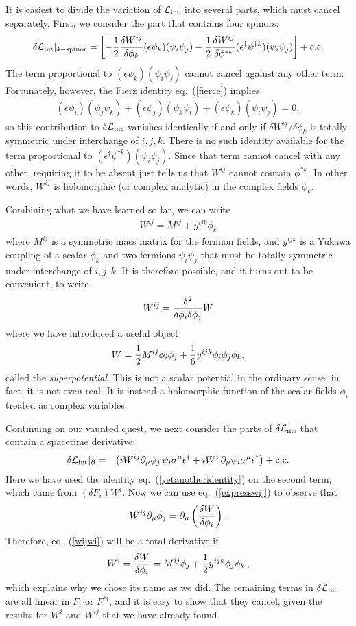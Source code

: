 \documentclass[12pt]{article}
\def\beq{\begin{eqnarray}}
\def\eeq{\end{eqnarray}}
\def\lagr{{\cal L}}
\def\conj{{{\rm c.c.}}}
\begin{document}
It is easiest to divide the variation of $\lagr_{\rm int}$ into several
parts, which must cancel separately. First, we consider the part that
contains four spinors:
\beq
\delta \lagr_{\rm int} |_{\rm 4-spinor} = \left [
-{1\over 2} {\delta W^{ij} \over \delta \phi_k} 
  (\epsilon \psi_k)(\psi_i \psi_j)
-{1\over 2} {\delta W^{ij} \over \delta \phi^{*k}}
  ({\epsilon^\dagger}{\psi}^{\dagger k})(\psi_i \psi_j) \right ]
+ \conj
\label{deltafourferm}
\eeq
The term proportional to $(\epsilon \psi_k)(\psi_i\psi_j)$ cannot cancel
against any other term. Fortunately, however, the Fierz identity
eq.~(\ref{fierce}) implies
\beq
(\epsilon \psi_i) (\psi_j \psi_k) + (\epsilon \psi_j) (\psi_k \psi_i)
+ (\epsilon \psi_k) (\psi_i\psi_j) = 0 ,
\eeq
so this contribution to $\delta\lagr_{\rm int}$ vanishes identically if
and only if $\delta W^{ij}/\delta \phi_k$ is totally symmetric under
interchange of $i,j,k$. There is no such identity available for the term
proportional to $({\epsilon^\dagger } {\psi}^{\dagger k})(\psi_i\psi_j)$.
Since that term cannot cancel with any other, requiring it to be absent
just tells us that $W^{ij}$ cannot contain $\phi^{*k}$. In other words,
$W^{ij}$ is holomorphic (or complex analytic) in the complex fields $\phi_k$.

Combining what we have learned  so far, we can write
\beq
W^{ij} = M^{ij} + y^{ijk} \phi_k
\eeq
where $M^{ij}$ is a symmetric mass matrix for the fermion fields, and
$y^{ijk}$ is a Yukawa coupling of a scalar $\phi_k$ and two fermions
$\psi_i \psi_j$ that must be totally symmetric under interchange of
$i,j,k$. It is therefore possible, and it turns out to be convenient, to
write
\beq
W^{ij} = {\delta^2 \over \delta\phi_i\delta\phi_j} W
\label{expresswij}
\eeq
where we have introduced a useful object
\beq
W =
{1\over 2} M^{ij} \phi_i \phi_j + {1\over 6} y^{ijk} \phi_i \phi_j \phi_k,
\label{superpotential}
\eeq
called the {\it superpotential}. This is not a
scalar potential in the ordinary sense; in fact, it is not even real. It
is instead a holomorphic function of the scalar fields $\phi_i$ treated as
complex variables. 

Continuing on our vaunted quest, we next consider the parts of 
$\delta \lagr_{\rm int}$ that contain a spacetime derivative: 
\beq
\delta \lagr_{\rm int} |_\partial &=& \left (
 i W^{ij}\partial_\mu \phi_j \, \psi_i \sigma^\mu {\epsilon^\dagger}
+ i W^i\, \partial_\mu \psi_i\sigma^\mu {\epsilon^\dagger}
\right ) +\conj
\label{wijwi}
\eeq
Here we have used the identity eq.~(\ref{yetanotheridentity}) on the
second term, which came from $(\delta F_i)W^i$. Now we can use
eq.~(\ref{expresswij}) to observe that
\beq
W^{ij} \partial_\mu \phi_j =
\partial_\mu \left ( {\delta W\over \delta{\phi_i}}\right ) .
\label{parttwo}
\eeq
Therefore, eq.~(\ref{wijwi}) will be a total derivative if
\beq
W^i = {\delta W\over \delta \phi_i} 
= M^{ij}\phi_j + {1\over 2} y^{ijk} \phi_j \phi_k\> ,
\label{wiwiwi}
\eeq
which explains why we chose its name as we did. The remaining terms in
$\delta \lagr_{\rm int}$ are all linear in $F_i$ or $F^{*i}$, and it is
easy to show that they cancel, given the results for $W^i$ and $W^{ij}$
that we have already found. 
\end{document}
